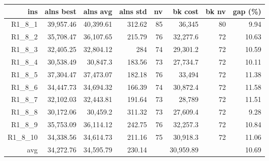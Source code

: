   \begin{table}[caption={Kết quả đo với tập HG\_R\_1\_8 800 yêu cầu}, label=exp:HGR18]
    \centering
    \begin{tabular}{rrrrrrrr}
    \hline
    ins & alns best & alns avg & alns std & nv & bk cost & bk nv & gap (\%) \\ \hline
    R1\_8\_1 & 39,957.46 & 40,399.61 & 312.62 & 85 & 36,345 & 80 & 9.94 \\ \hline
    R1\_8\_2 & 35,708.47 & 36,107.65 & 215.79 & 76 & 32,277.6 & 72 & 10.63 \\ \hline
    R1\_8\_3 & 32,405.25 & 32,804.12 & 284 & 74 & 29,301.2 & 72 & 10.59 \\ \hline
    R1\_8\_4 & 30,538.49 & 30,847.3 & 183.56 & 73 & 27,734.7 & 72 & 10.11 \\ \hline
    R1\_8\_5 & 37,304.47 & 37,473.07 & 182.18 & 76 & 33,494 & 72 & 11.38 \\ \hline
    R1\_8\_6 & 34,447.73 & 34,694.32 & 166.39 & 74 & 30,872.4 & 72 & 11.58 \\ \hline
    R1\_8\_7 & 32,102.03 & 32,443.81 & 191.64 & 73 & 28,789 & 72 & 11.51 \\ \hline
    R1\_8\_8 & 30,172.06 & 30,459.2 & 311.32 & 73 & 27,609.4 & 72 & 9.28 \\ \hline
    R1\_8\_9 & 35,753.09 & 36,114.12 & 242.75 & 76 & 32,257.3 & 72 & 10.84 \\ \hline
    R1\_8\_10 & 34,338.56 & 34,614.73 & 211.16 & 75 & 30,918.3 & 72 & 11.06 \\ \hline
    avg & 34,272.76 & 34,595.79 & 230.14 & & 30,959.89 & & 10.69 \\ \hline
    \end{tabular}
  \end{table}

